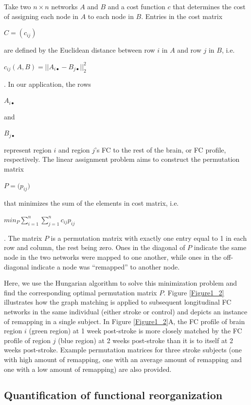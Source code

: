 \documentclass[phd,tocprelim]{cornell}
\begin{document}
	Take two $n \times n $ networks $A$ and $B$ and a cost function $c$ that determines the cost of assigning each node in $A$ to each node in $B$. Entries in the cost matrix 
	\begin{Large}
	$C = (c_{i j})$
	\end{Large}
	 are defined by the Euclidean distance between row $i$ in $A$ and row $j$ in $B$, i.e. \begin{Large}$c_{ij}(A,B)=|| A_{i\bullet}-B_{j \bullet} ||^2_2$\end{Large}. In our application, the rows \begin{Large}$A_{i\bullet}$\end{Large} and \begin{Large}$B_{j \bullet}$\end{Large} represent region $i$ and region $j$'s FC to the rest of the brain, or FC profile, respectively. The linear assignment problem aims to construct the permutation matrix \begin{Large}$P = \big(p_{i j}\big)$\end{Large} that minimizes the sum of the elements in cost matrix, i.e. \begin{Large}$min_P\sum^n_{i=1}\sum^n_{j=1}c_{ij}p_{ij}$\end{Large} . The matrix $P$ is a permutation matrix with exactly one entry equal to 1 in each row and column, the rest being zero. Ones in the diagonal of $P$ indicate the same node in the two networks were mapped to one another, while ones in the off-diagonal indicate a node was “remapped” to another node.
	
	Here, we use the Hungarian algorithm to solve this minimization problem and find the corresponding optimal permutation matrix $P$. Figure \ref{Figure1_2} illustrates how the graph matching is applied to subsequent longitudinal FC networks in the same individual (either stroke or control) and depicts an instance of remapping in a single subject.  In Figure \ref{Figure1_2}A, the FC profile of brain region $i$ (green region) at 1 week post-stroke is more closely matched by the FC profile of region $j$ (blue region) at 2 weeks post-stroke than it is to itself at 2 weeks post-stroke. Example permutation matrices for three stroke subjects (one with high amount of remapping, one with an average amount of remapping and one with a low amount of remapping) are also provided. 
	
	\subsection{Quantification of functional reorganization}
	
\end{document}
